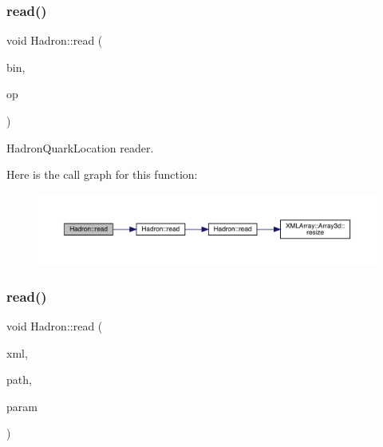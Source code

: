 \subsubsection{\texorpdfstring{read()}{read()}\hspace{0.1cm}{\footnotesize\ttfamily [66/94]}}
{\footnotesize\ttfamily void Hadron\+::read (\begin{DoxyParamCaption}\item[{\mbox{\hyperlink{classADATIO_1_1BinaryReader}{Binary\+Reader}} \&}]{bin,  }\item[{\mbox{\hyperlink{structHadron_1_1HadronQuarkLocation__t}{Hadron\+Quark\+Location\+\_\+t}} \&}]{op }\end{DoxyParamCaption})}



Hadron\+Quark\+Location reader. 

Here is the call graph for this function\+:\nopagebreak
\begin{figure}[H]
\begin{center}
\leavevmode
\includegraphics[width=350pt]{d1/daf/namespaceHadron_a6860ee691eb6d64d0fb2d52f4977316b_cgraph}
\end{center}
\end{figure}
\mbox{\label{namespaceHadron_a6eef93fdb3fe356c6326b6e8e0757ccb}} 
\subsubsection{\texorpdfstring{read()}{read()}\hspace{0.1cm}{\footnotesize\ttfamily [67/94]}}
{\footnotesize\ttfamily void Hadron\+::read (\begin{DoxyParamCaption}\item[{\mbox{\hyperlink{classADATXML_1_1XMLReader}{X\+M\+L\+Reader}} \&}]{xml,  }\item[{const std\+::string \&}]{path,  }\item[{\mbox{\hyperlink{structHadron_1_1KeyHadronNode__t_1_1Quark__t}{Key\+Hadron\+Node\+\_\+t\+::\+Quark\+\_\+t}} \&}]{param }\end{DoxyParamCaption})}



